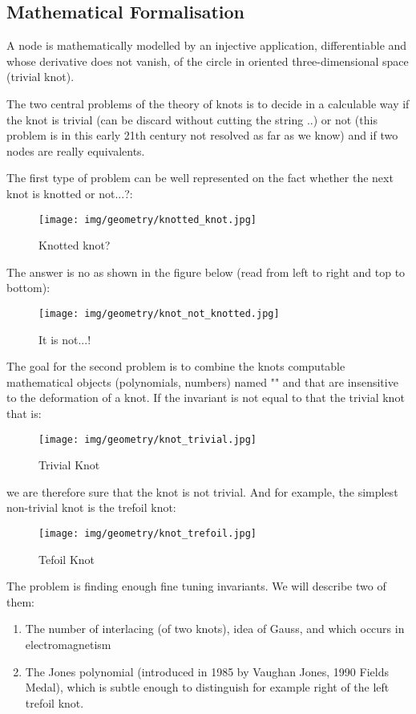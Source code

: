 {	\pagebreak
	\subsection{Mathematical Formalisation}
	A node is mathematically modelled by an injective application, differentiable and whose derivative does not vanish, of the circle in oriented three-dimensional space (trivial knot).
	
	The two central problems of the theory of knots is to decide in a calculable way if the knot is trivial (can be discard without cutting the string ..) or not (this problem is in this early 21th century not resolved as far as we know) and if two nodes are really equivalents.
	
	The first type of problem can be well represented on the fact whether the next knot is knotted or not...?:
	\begin{figure}[H]
		\centering
		\texttt{[image: img/geometry/knotted\_knot.jpg]}
		\caption{Knotted knot?}
	\end{figure}
	The answer is no as shown in the figure below (read from left to right and top to bottom):
	\begin{figure}[H]
		\centering
		\texttt{[image: img/geometry/knot\_not\_knotted.jpg]}
		\caption[]{It is not...!}
	\end{figure}
	The goal for the second problem is to combine the knots computable mathematical objects (polynomials, numbers) named "" and that are insensitive to the deformation of a knot. If the invariant is not equal to that the trivial knot that is:
	\begin{figure}[H]
		\centering
		\texttt{[image: img/geometry/knot\_trivial.jpg]}
		\caption{Trivial Knot}
	\end{figure}
	we are therefore sure that the knot is not trivial. And for example, the simplest non-trivial knot is the trefoil knot:
	\begin{figure}[H]
		\centering
		\texttt{[image: img/geometry/knot\_trefoil.jpg]}
		\caption{Tefoil Knot}
	\end{figure}
	The problem is finding enough fine tuning invariants. We will describe two of them:
	\begin{enumerate}
		\item The number of interlacing (of two knots), idea of Gauss, and which occurs in electromagnetism
		
		\item The Jones polynomial (introduced in 1985 by Vaughan Jones, 1990 Fields Medal), which is subtle enough to distinguish for example right of the left trefoil knot.
	\end{enumerate}
	
}
